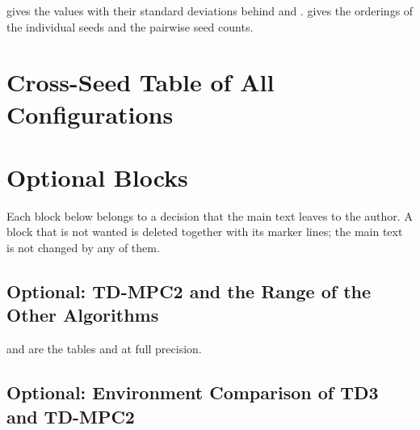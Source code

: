  gives the values with their standard deviations behind  and .
 gives the orderings of the individual seeds and  the pairwise seed counts.


\section{Cross-Seed Table of All Configurations}\label{sec:app-full-cross}


\section{Optional Blocks}\label{sec:app-full-opt}

Each block below belongs to a decision that the main text leaves to the author.
A block that is not wanted is deleted together with its marker lines; the main text is not changed by any of them.

\subsection{Optional: TD-MPC2 and the Range of the Other Algorithms}\label{sec:app-opt-rob}

 and  are the tables  and  at full precision.


\subsection{Optional: Environment Comparison of TD3 and TD-MPC2}\label{sec:app-opt-env}

